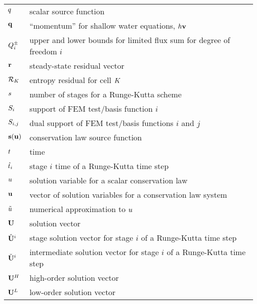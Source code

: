 \begin{center}
\begin{longtable}{l p{4.8in}}
$q$    & scalar source function\\
$\mathbf{q}$  & ``momentum'' for shallow water equations,
                     $h\mathbf{v}$\\
$Q^\pm_i$ & upper and lower bounds for limited flux sum for degree
                        of freedom $i$\\
$\mathbf{r}$           & steady-state residual vector\\
$\mathcal{R}_K$ & entropy residual for cell $K$\\
$s$       & number of stages for a Runge-Kutta scheme\\
$S_i$       & support of FEM test/basis function $i$\\
$S_{i,j}$      & dual support of FEM test/basis functions $i$ and $j$\\
$\mathbf{s}(\mathbf{u})$      & conservation law source function\\
$t$       & time\\

$\hat{t}_i$   & stage $i$ time of a Runge-Kutta time step\\
$u$  & solution variable for a scalar conservation law\\
$\mathbf{u}$  & vector of solution variables for a conservation law
                     system\\
$\tilde{u}$ & numerical approximation to $u$\\
$\mathbf{U}$  & solution vector\\
$\hat{\mathbf{U}}^i$ & stage solution vector for stage $i$ of a Runge-Kutta time
                       step\\
$\tilde{\mathbf{U}}^i$ & intermediate solution vector for stage $i$ of a
                              Runge-Kutta time step\\
$\highordersolution$ & high-order solution vector\\
$\lowordersolution$ & low-order solution vector\\


\end{longtable}
\end{center}
